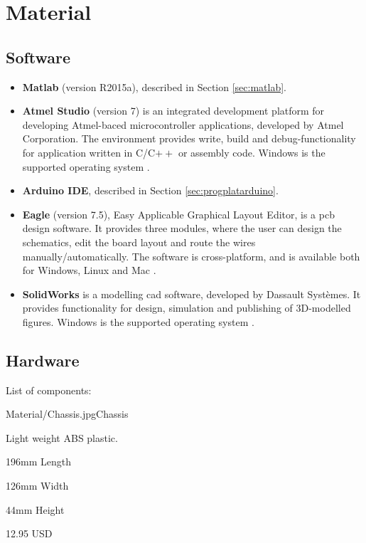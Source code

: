 \chapter{Material}

\section{Software}
\label{sec:software}
\begin{itemize}
    \item \textbf{Matlab} (version R2015a), described in Section \ref{sec:matlab}.
    \item \textbf{Atmel Studio} (version 7) is an integrated development platform for developing Atmel-baced microcontroller applications, developed by Atmel Corporation. The environment provides write, build and debug-functionality for application written in C/C$++$ or assembly code. Windows is the supported operating system \cite{atmel}. 
    \item \textbf{Arduino IDE}, described in Section \ref{sec:progplatarduino}.
    \item \textbf{Eagle} (version 7.5), Easy Applicable Graphical Layout Editor, is a \acrfull{pcb} design software. It provides three modules, where the user can design the schematics, edit the board layout and route the wires manually/automatically. The software is cross-platform, and is available both for Windows, Linux and Mac \cite{eagle}.
    \item \textbf{SolidWorks} is a modelling \acrfull{cad} software, developed by Dassault Systèmes. It provides functionality for design, simulation and publishing of 3D-modelled figures. Windows is the supported operating system \cite{solidworks}.
\end{itemize}

\section{Hardware}
\label{sec:hardware}
List of components:

\begin{material}{Material/Chassis.jpg}{Chassis}
\item Light weight ABS plastic.
\item 196mm Length 
\item 126mm Width 
\item 44mm Height
\item 12.95 USD
\end{material}

